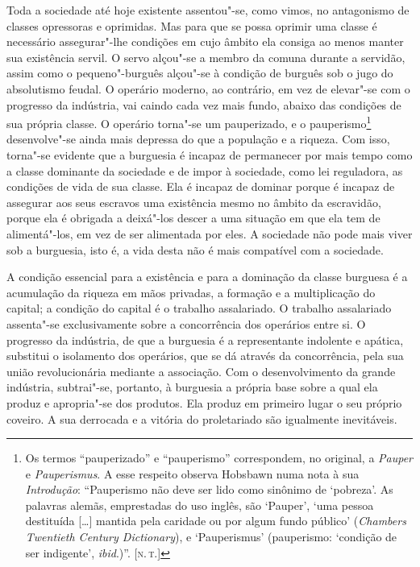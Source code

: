 Toda a sociedade até hoje existente assentou"-se, como vimos,
no antagonismo de classes opressoras e oprimidas. Mas para que se possa
oprimir uma classe é necessário assegurar"-lhe condições em cujo
âmbito ela consiga ao menos manter sua existência servil. O servo
alçou"-se a membro da comuna durante a servidão, assim como o
pequeno"-burguês alçou"-se à condição de burguês sob o jugo do
absolutismo feudal. O operário moderno, ao contrário, em vez de
elevar"-se com o progresso da indústria, vai caindo cada vez mais
fundo, abaixo das condições de sua própria classe. O operário
torna"-se um pauperizado, e o
pauperismo\footnote{Os termos ``pauperizado'' e ``pauperismo'' correspondem, 
no original, a \textit{Pauper} e \textit{Pauperismus}. A esse respeito observa 
Hobsbawn numa nota à sua \textit{Introdução}: ``Pauperismo não deve ser lido
como sinônimo de ‘pobreza’. As palavras alemãs, emprestadas do uso
inglês, são ‘Pauper’, ‘uma pessoa destituída [\ldots] mantida pela
caridade ou por algum fundo público’ (\textit{Chambers Twentieth
Century Dictionary}), e ‘Pauperismus’ (pauperismo: ‘condição de ser
indigente’, \textit{ibid}.)''. [\textsc{n.\,t.}]}
desenvolve"-se ainda mais depressa do que a população e a
riqueza. Com isso, torna"-se evidente que a burguesia é incapaz de
permanecer por mais tempo como a classe dominante da sociedade e de
impor à sociedade, como lei reguladora, as condições de vida de sua
classe. Ela é incapaz de dominar porque é incapaz de assegurar aos seus
escravos uma existência mesmo no âmbito da escravidão, porque ela é
obrigada a deixá"-los descer a uma situação em que ela tem de
alimentá"-los, em vez de ser alimentada por eles. A sociedade não pode
mais viver sob a burguesia, isto é, a vida desta não é mais compatível
com a sociedade.

A condição essencial para a existência e para a dominação da classe
burguesa é a acumulação da riqueza em mãos privadas, a formação e a
multiplicação do capital; a condição do capital é o trabalho
assalariado. O trabalho assalariado assenta"-se exclusivamente sobre a
concorrência dos operários entre si. O progresso da indústria, de que a
burguesia é a representante indolente e apática, substitui o isolamento
dos operários, que se dá através da concorrência, pela sua união
revolucionária mediante a associação. Com o desenvolvimento da grande
indústria, subtrai"-se, portanto, à burguesia a própria base sobre a
qual ela produz e apropria"-se dos produtos. Ela produz em primeiro
lugar o seu próprio coveiro. A sua derrocada e a vitória do
proletariado são igualmente inevitáveis.

